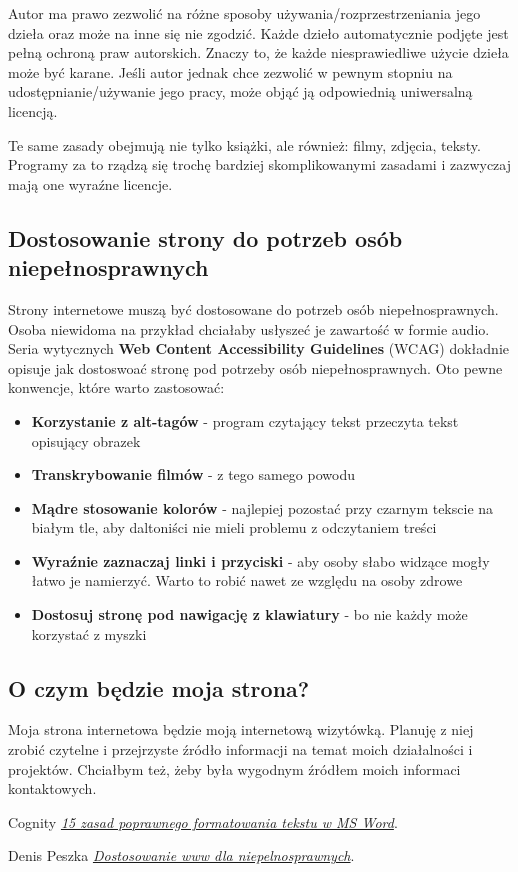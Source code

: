 \documentclass[11pt,polish]{article}
\begin{document}
Autor ma prawo zezwolić na różne sposoby używania/rozprzestrzeniania jego dzieła oraz może na inne się nie zgodzić. Każde dzieło automatycznie podjęte jest pełną ochroną praw autorskich. Znaczy to, że każde niesprawiedliwe użycie dzieła może być karane. Jeśli autor jednak chce zezwolić w pewnym stopniu na udostępnianie/używanie jego pracy, może objąć ją odpowiednią uniwersalną licencją.

Te same zasady obejmują nie tylko książki, ale również: filmy, zdjęcia, teksty. Programy za to rządzą się trochę bardziej skomplikowanymi zasadami i zazwyczaj mają one wyraźne licencje.

\newpage

\subsection{Dostosowanie strony do potrzeb osób niepełnosprawnych}
Strony internetowe muszą być dostosowane do potrzeb osób niepełnosprawnych. Osoba niewidoma na przykład chciałaby usłyszeć je zawartość w formie audio. Seria wytycznych \textbf{Web Content Accessibility Guidelines} (WCAG) dokładnie opisuje jak dostoswoać stronę pod potrzeby osób niepełnosprawnych. Oto pewne konwencje, które warto zastosować:
\begin{itemize}
  \item{\textbf{Korzystanie z alt-tagów} - program czytający tekst przeczyta tekst opisujący obrazek }
  \item{\textbf{Transkrybowanie filmów} - z tego samego powodu }
  \item{\textbf{Mądre stosowanie kolorów} - najlepiej pozostać przy czarnym tekscie na białym tle, aby daltoniści nie mieli problemu z odczytaniem treści}
  \item{\textbf{Wyraźnie zaznaczaj linki i przyciski} - aby osoby słabo widzące mogły łatwo je namierzyć. Warto to robić nawet ze względu na osoby zdrowe}
  \item{\textbf{Dostosuj stronę pod nawigację z klawiatury} - bo nie każdy może korzystać z myszki}
\end{itemize}

\subsection{O czym będzie moja strona?}
Moja strona internetowa będzie moją internetową wizytówką. Planuję z niej zrobić czytelne i przejrzyste źródło informacji na temat moich działalności i projektów. Chciałbym też, żeby była wygodnym źródłem moich informaci kontaktowych.

\begin{thebibliography}{1}

   Cognity \href{https://www.cognity.pl/15-zasad-poprawnego-formatowania-tekstu-wnbspms-word,blog,105.html}{\em 15 zasad poprawnego formatowania tekstu w MS Word}.

   Denis Peszka \href{https://smartbees.pl/blog/dostosowanie-strony-www-dla-niepelnosprawnych-6-przydatnych-porad}{\em Dostosowanie www dla niepelnosprawnych}.
  
  \end{thebibliography}
\end{document}
